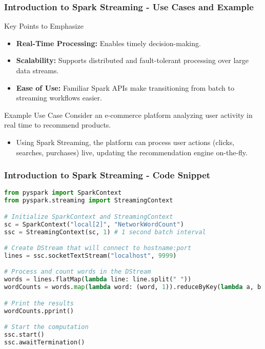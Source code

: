 \documentclass[aspectratio=169]{beamer}
\begin{document}
\begin{frame}[fragile]
    \frametitle{Introduction to Spark Streaming - Use Cases and Example}
    \begin{block}{Key Points to Emphasize}
        \begin{itemize}
            \item \textbf{Real-Time Processing:} Enables timely decision-making.
            \item \textbf{Scalability:} Supports distributed and fault-tolerant processing over large data streams.
            \item \textbf{Ease of Use:} Familiar Spark APIs make transitioning from batch to streaming workflows easier.
        \end{itemize}
    \end{block}
    
    \begin{block}{Example Use Case}
        Consider an e-commerce platform analyzing user activity in real time to recommend products. 
        \begin{itemize}
            \item Using Spark Streaming, the platform can process user actions (clicks, searches, purchases) live, updating the recommendation engine on-the-fly.
        \end{itemize}
    \end{block}
\end{frame}

\begin{frame}[fragile]
    \frametitle{Introduction to Spark Streaming - Code Snippet}
    \begin{lstlisting}[language=python]
from pyspark import SparkContext
from pyspark.streaming import StreamingContext

# Initialize SparkContext and StreamingContext
sc = SparkContext("local[2]", "NetworkWordCount")
ssc = StreamingContext(sc, 1) # 1 second batch interval

# Create DStream that will connect to hostname:port
lines = ssc.socketTextStream("localhost", 9999)

# Process and count words in the DStream
words = lines.flatMap(lambda line: line.split(" "))
wordCounts = words.map(lambda word: (word, 1)).reduceByKey(lambda a, b: a + b)

# Print the results
wordCounts.pprint()

# Start the computation
ssc.start()
ssc.awaitTermination()
    \end{lstlisting}
\end{frame}
\end{document}
